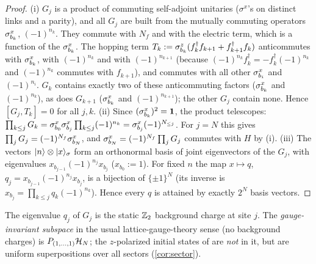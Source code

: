 \begin{proof}
(i) $G_j$ is a product of commuting self-adjoint unitaries ($\sigma^x$'s on distinct links and a
parity), and all $G_j$ are built from the mutually commuting operators $\sigma^{x}_{b_{k}}$, $(-1)^{n_k}$.  They
commute with $N_f$ and with the electric term, which is a function of the $\sigma^{x}_{b_{k}}$.  The hopping
term $T_k:=\sigma^{z}_{b_{k}}(f_k^\dagger f_{k+1}+f_{k+1}^\dagger f_k)$ anticommutes with $\sigma^{x}_{b_{k}}$, with
$(-1)^{n_k}$ and with $(-1)^{n_{k+1}}$ (because $(-1)^{n_k}f_k^\dagger=-f_k^\dagger(-1)^{n_k}$ and
$(-1)^{n_k}$ commutes with $f_{k+1}$), and commutes with all other $\sigma^{x}_{b_{i}}$ and $(-1)^{n_i}$.
$G_k$ contains exactly two of these anticommuting factors ($\sigma^{x}_{b_{k}}$ and $(-1)^{n_k}$), as does
$G_{k+1}$ ($\sigma^{x}_{b_{k}}$ and $(-1)^{n_{k+1}}$); the other $G_j$ contain none.  Hence $[G_j,T_k]=0$
for all $j,k$.
(ii) Since $(\sigma^{x}_{b_{k}})^2=\mathbf{1}$, the product telescopes:
$\prod_{k\le j}G_k=\sigma^{x}_{b_{0}}\sigma^{x}_{b_{j}}\prod_{k\le j}(-1)^{n_k}=\sigma^{x}_{b_{j}}(-1)^{N_{\le j}}$.  For $j=N$ this
gives $\prod_jG_j=(-1)^{N_f}\sigma^{x}_{b_{N}}$, and $\sigma^{x}_{b_{N}}=(-1)^{N_f}\prod_jG_j$ commutes with $H$ by (i).
(iii) The vectors $|n\rangle\otimes|x\rangle_\sigma$ form an orthonormal basis of joint eigenvectors of
the $G_j$, with eigenvalues $x_{b_{j-1}}(-1)^{n_j}x_{b_j}$ ($x_{b_0}:=1$).  For fixed $n$ the map
$x\mapsto q$, $q_j=x_{b_{j-1}}(-1)^{n_j}x_{b_j}$, is a bijection of $\{\pm1\}^N$ (its inverse is
$x_{b_j}=\prod_{k\le j}q_k(-1)^{n_k}$).  Hence every $q$ is attained by exactly $2^N$ basis vectors.
\end{proof}

The eigenvalue $q_j$ of $G_j$ is the static $\mathbb{Z}_2$ background charge at site $j$.  The
\emph{gauge-invariant subspace} in the usual lattice-gauge-theory sense (no background charges) is
$P_{(1,\dots,1)}\mathcal{H}_N$; the $z$-polarized initial states of \cite{SKKM2017} are \emph{not} in it,
but are uniform superpositions over all sectors (\cref{cor:sector}).

